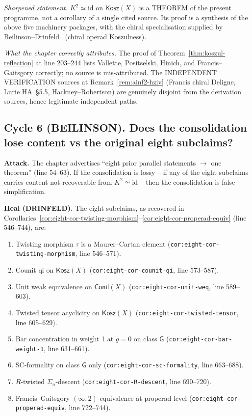 \documentclass[11pt]{article}
\theoremstyle{definition}
\newcommand{\Kosz}{\mathsf{Kosz}}
\newcommand{\Conil}{\mathsf{Conil}}
\newcommand{\id}{\mathrm{id}}
\begin{document}
\emph{Sharpened statement.} $K^{2}\simeq\id$ on $\Kosz(X)$ is a
THEOREM of the present programme, not a corollary of a single cited
source. Its proof is a synthesis of the above five machinery
packages, with the chiral specialisation supplied by
Beilinson--Drinfeld~\cite[\S3.6]{BD04} (chiral operad Koszulness).

\emph{What the chapter correctly attributes.} The proof of
Theorem~\ref{thm:koszul-reflection} at line 203--244 lists Vallette,
Positselski, Hinich, and Francis--Gaitsgory correctly; no source
is mis-attributed. The INDEPENDENT VERIFICATION sources at
Remark~\ref{rem:ainf2-hziv} (Francis chiral Deligne, Lurie HA~\S5.5,
Hackney--Robertson) are genuinely disjoint from the derivation
sources, hence legitimate independent paths.

\subsection*{Cycle 6 (BEILINSON). Does the consolidation lose content
vs the original eight subclaims?}

\textbf{Attack.} The chapter advertises ``eight prior parallel
statements $\to$ one theorem'' (line 54--63). If the consolidation
is lossy -- if any of the eight subclaims carries content not
recoverable from $K^{2}\simeq\id$ -- then the consolidation is
false simplification.

\textbf{Heal (DRINFELD).} The eight subclaims, as recovered in
Corollaries~\ref{cor:eight-cor-twisting-morphism}--\ref{cor:eight-cor-properad-equiv}
(line 546--744), are:
\begin{enumerate}
\item Twisting morphism $\tau$ is a Maurer--Cartan element
(\texttt{cor:eight-cor-twisting-morphism}, line 546--571).
\item Counit qi on $\Kosz(X)$ (\texttt{cor:eight-cor-counit-qi},
line 573--587).
\item Unit weak equivalence on $\Conil(X)$ (\texttt{cor:eight-cor-unit-weq},
line 589--603).
\item Twisted tensor acyclicity on $\Kosz(X)$
(\texttt{cor:eight-cor-twisted-tensor}, line 605--629).
\item Bar concentration in weight 1 at $g=0$ on class $\mathsf{G}$
(\texttt{cor:eight-cor-bar-weight-1}, line 631--661).
\item SC-formality on class $\mathsf{G}$ only
(\texttt{cor:eight-cor-sc-formality}, line 663--688).
\item $R$-twisted $\Sigma_n$-descent (\texttt{cor:eight-cor-R-descent},
line 690--720).
\item Francis--Gaitsgory $(\infty,2)$-equivalence at properad level
(\texttt{cor:eight-cor-properad-equiv}, line 722--744).
\end{enumerate}
\end{document}
